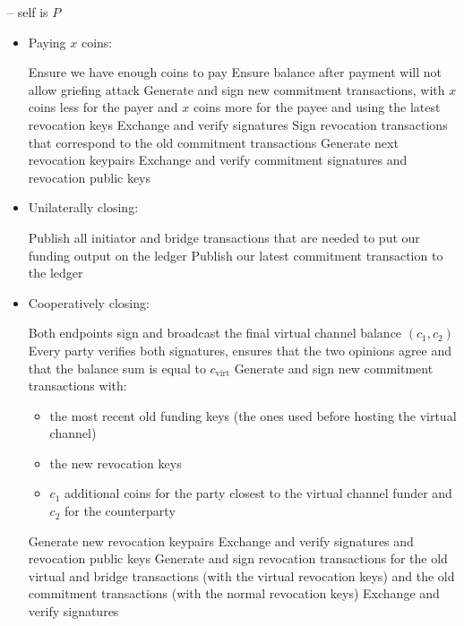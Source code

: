 \begin{center}
\begin{processbox}{\pchan -- self is $P$}
\begin{itemize}
      \item Paying $x$ coins:
      \begin{algorithmic}[0]
        \State Ensure we have enough coins to pay
          \State Ensure balance after payment will not allow griefing attack
        \EndIf
        \State Generate and sign new commitment transactions, with $x$ coins
        less for the payer and $x$ coins more for the payee and using the latest
        revocation keys
        \State Exchange and verify signatures
        \State Sign revocation transactions that correspond to the old
        commitment transactions
        \State Generate next revocation keypairs
        \State Exchange and verify commitment signatures and revocation public
        keys
      \end{algorithmic}

      \item Unilaterally closing:
      \begin{algorithmic}[0]
        \State Publish all initiator and bridge transactions that are needed to
        put our funding output on the ledger
        \State Publish our latest commitment transaction to the ledger
      \end{algorithmic}

      \item Cooperatively closing:
      \begin{algorithmic}[0]
        \State {}
        \State Both endpoints sign and broadcast the final virtual channel
        balance $(c_1, c_2)$
        \State Every party verifies both signatures, ensures that the two
        opinions agree and that the balance sum is equal to $c_{\mathrm{virt}}$
        \State Generate and sign new commitment transactions with:
        \begin{itemize}
          \item the most recent old funding keys (the ones used before hosting
          the virtual channel)
          \item the new revocation keys
          \item $c_1$ additional coins for the party closest to the virtual
          channel funder and $c_2$ for the counterparty
        \end{itemize}
        \State Generate new revocation keypairs
        \State Exchange and verify signatures and revocation public keys
        \State Generate and sign revocation transactions for the old
        virtual and bridge transactions (with the virtual revocation keys) and
        the old commitment transactions (with the normal revocation keys)
        \State Exchange and verify signatures 
      \end{algorithmic}


\end{itemize}
\end{processbox}
\end{center}
